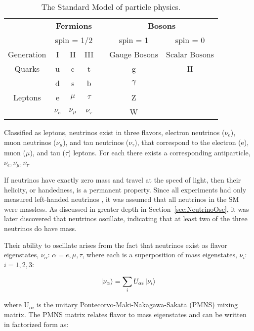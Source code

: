 \begin{table}
	\centering
\begin{tabular}{|c|c|c|c|c|c|c|}
	\hline 
	& \multicolumn{3}{c|}{\textbf{Fermions}} & & \multicolumn{2}{c|}{\textbf{Bosons}}  \\ 
	& \multicolumn{3}{c|}{spin = 1/2} & & spin = 1 & spin = 0 \\
	\hline 
	Generation & I & II & III & & Gauge Bosons & Scalar Bosons \\ 
	\hline 
	Quarks & u & c & t & & g & H \\ 
	& d & s & b & & $\gamma$ &  \\ 
	Leptons & e & $\mu$ & $\tau$ & &  Z &  \\ 
	& $\nu_{e}$ & $\nu_{\mu}$ & $\nu_{\tau}$ & & W &  \\ 
	\hline 
\end{tabular}
\caption{The Standard Model of particle physics.}
\label{tab:SM}
\end{table}

Classified as leptons, neutrinos exist in three flavors, electron neutrinos ($\nu_{e}$), muon neutrinos ($\nu_{\mu}$), and tau neutrinos ($\nu_{\tau}$), that correspond to the electron (e), muon ($\mu$), and tau ($\tau$) leptons.
For each there exists a corresponding antiparticle, $\bar{\nu_e}, \bar{\nu_\mu}, \bar{\nu_\tau}$.

If neutrinos have exactly zero mass and travel at the speed of light, then their helicity, or handedness, is a permanent property. 
Since all experiments had only measured left-handed neutrinos \cite{PhysRev.109.1015}, it was assumed that all neutrinos in the SM were massless.
As discussed in greater depth in Section~\ref{sec:NeutrinoOsc}, it was later discovered that neutrinos oscillate, indicating that at least two of the three neutrinos do have mass.

Their ability to oscillate arises from the fact that neutrinos exist as flavor eigenstates, $\nu_\alpha$: $\alpha = e, \mu, \tau$, where each is a superposition of mass eigenstates, $\nu_i$: $i = 1, 2, 3$:

\begin{equation}
	\ket{\nu_\alpha} = \sum_{i}U_{\alpha i}\ket{\nu_i}
\end{equation}

where U$_{\alpha i}$ is the unitary Pontecorvo-Maki-Nakagawa-Sakata (PMNS) mixing matrix. 
The PMNS matrix relates flavor to mass eigenstates and can be written in factorized form as:

